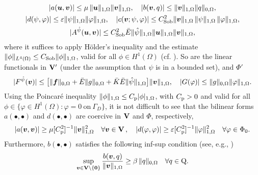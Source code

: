 \begin{gather*}\vert a(\boldsymbol{u},\boldsymbol{v})\vert \leq \mu\, \Vert \boldsymbol{u}\Vert_{1,\Omega}\Vert \boldsymbol{v}\Vert_{1,\Omega}, \quad 
|b(\boldsymbol{v},q)| \leq \|\boldsymbol{v}\|_{1,\Omega}\|q\|_{0,\Omega}, \\|d(\psi,\varphi)| \leq \varepsilon\|\psi\|_{1,\Omega}\|\varphi\|_{1,\Omega}, \quad 
|{c}(\boldsymbol{v};\psi,\varphi)|\leq C_{\mathrm{Sob}}^2 \Vert\boldsymbol{v}\Vert_{1,\Omega}\,\Vert\psi\Vert_{1,\Omega}\, \Vert\varphi\Vert_{1,\Omega}, \\ |A^{\hat{\psi}}(\boldsymbol{u},\boldsymbol{v})| \leq C_{\mathrm{Sob}}^2 \bar{E}\Vert\hat{\psi}\Vert_{1,\Omega} \Vert \boldsymbol{u}\Vert_{1,\Omega}\Vert \boldsymbol{v}\Vert_{1,\Omega},
\end{gather*}
where it suffices to apply  Hölder's inequality and the estimate $\|\phi\|_{L^4(\Omega)}\leq C_{\mathrm{Sob}} \|\phi\|_{1,\Omega}$, 
valid for all $\phi\in H^1(\Omega)$ (cf. \cite[Th. 1.3.3]{quarteroni94}). So are the linear functionals  in $\mathbf{V}'$ (under the assumption that $\hat{\psi}$ is in a bounded set), and $\Phi'$
\[ | F^{\hat{\psi}}(\boldsymbol{v}) | \leq \bigl[\|\boldsymbol{f}\|_{0,\Omega} + \bar{E}\|g\|_{0,\Omega} + \bar{K}\bar{E}\|\hat{\psi}\|_{1,\Omega}\bigr] \|\boldsymbol{v}\|_{1,\Omega}, \quad 
|G(\varphi)| \leq \|g\|_{0,\Omega} \|\varphi\|_{1,\Omega}.\]
Using the Poincar\'e inequality $\|\phi\|_{1,\Omega}\leq C_{\mathrm{p}} |\phi|_{1,\Omega}$, with $C_{\mathrm{p}}>0$ and valid for all $\phi\in\{\varphi \in H^1(\Omega): \varphi = 0 \ \text{on} \ \Gamma_D\}$, it is not difficult to see that the bilinear forms $a(\bullet,\bullet)$ and $d(\bullet,\bullet)$ are coercive in $\mathbf{V}$  and $\Phi$, respectively, %
\begin{equation*}
|a(\boldsymbol{v},\boldsymbol{v})|\geq {\mu}[C_{\mathrm{p}}^2]^{-1}\Vert \boldsymbol{v}\Vert_{1,\Omega}^2  \quad \forall \boldsymbol{v} \in \mathbf{V}\, , \quad  
|d(\varphi,\varphi)|\geq \varepsilon[{C_{\mathrm{p}}^2}]^{-1}\Vert \varphi\Vert_{1,\Omega}^2 \quad \forall \varphi \in \Phi_0.  \end{equation*}
Furthermore, $b(\bullet,\bullet)$ satisfies the following inf-sup condition (see, e.g., \cite{ern04})
\begin{equation*}
\sup_{\boldsymbol{v} \in \mathbf{V}\setminus\{\boldsymbol{0}\}}\frac{b(\boldsymbol{v},q)}{\|\boldsymbol{v}\|_{1,\Omega}}  \geq \beta \, \|q\|_{0,\Omega} \quad \forall q\in \mathrm{Q}.
\end{equation*}

